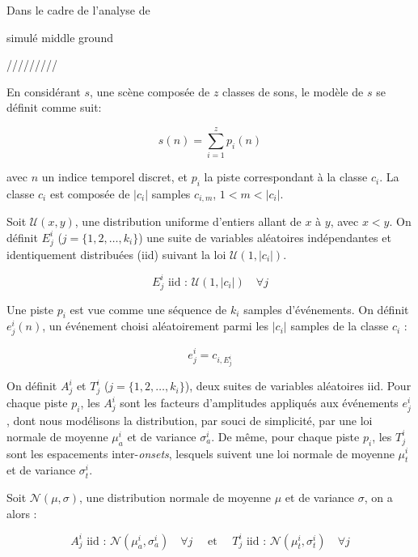 Dans le cadre de l'analyse de

simulé middle ground

/////////


En considérant $s$, une scène composée de $z$ classes de sons, le modèle de $s$ se définit comme suit:

\begin{equation}
s(n)=\sum_{i=1}^{z}p_i(n)
\end{equation}

avec $n$ un indice temporel discret, et $p_i$ la piste correspondant à la classe $c_i$. La classe $c_i$ est composée de $\vert c_i\vert$ samples $c_{i,m}$, $1<m<\vert c_i\vert$.

Soit $\mathcal{U}(x,y)$, une distribution uniforme d'entiers allant de $x$ à $y$, avec $x<y$. On définit $E_j^i$ ($j=\lbrace 1,2,\ldots,k_i\rbrace$) une suite de variables aléatoires indépendantes et identiquement distribuées (iid) suivant la loi $\mathcal{U}(1,\vert c_i \vert)$.

\begin{equation}
E_j^i \textrm{ iid : } \mathcal{U}(1,\vert c_i \vert) \quad \forall j
\end{equation}

Une piste $p_i$ est vue comme une séquence de $k_i$ samples d'événements. On définit $e_j^i(n)$, un événement choisi aléatoirement parmi les $\vert c_i\vert$ samples de la classe $c_i$ :

\begin{equation}
e_j^i=c_{i,E_j^i}
\end{equation}

On définit $A^i_j$ et $T^i_j$ ($j=\lbrace 1,2,\ldots,k_i\rbrace$), deux suites de variables aléatoires iid. Pour chaque piste $p_i$, les $A^i_j$ sont les facteurs d'amplitudes appliqués aux événements $e_j^i$, dont nous modélisons la distribution, par souci de simplicité, par une loi normale de moyenne $\mu_a^i$ et de variance $\sigma_a^i$. De même, pour chaque piste $p_i$, les $T_j^i$ sont les espacements inter-\emph{onsets}, lesquels suivent une loi normale de moyenne $\mu_t^i$ et de variance $\sigma_t^i$.

Soit $\mathcal{N}(\mu,\sigma)$, une distribution normale de moyenne $\mu$ et de variance $\sigma$, on a alors :

\begin{equation}
\label{eq:ch4_eq1}
A_j^i \textrm{ iid : } \mathcal{N}(\mu_a^{i},\sigma_a^{i}) \quad \forall j \quad \textrm{ et } \quad T_j^i \textrm{ iid : } \mathcal{N}({\mu_t^{i},\sigma_t^{i}}) \quad \forall j
\end{equation}

